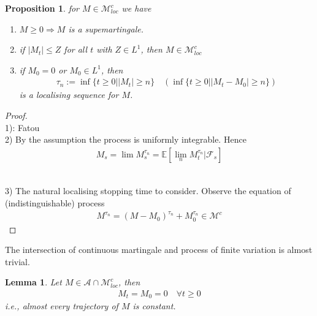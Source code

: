 \documentclass[a4paper,11pt]{book}
\newtheorem{lemma}[theorem]{Lemma}
\newtheorem{proposition}[theorem]{Proposition}
\theoremstyle{definition}
\theoremstyle{remark}
\begin{document}
\begin{proposition}
	for $M \in \mathcal{M}_{loc}^c$ we have
	\begin{enumerate}
		\item $M \ge 0 \Rightarrow M$ is a supemartingale. 
		\item if $|M_t| \le Z$ for all $t$ with $Z \in L^1$, then $M \in \mathcal{M}_{loc}^c$
		\item if $M_0 = 0$ or $M_0 \in L^1$, then 
		\begin{align*}
			\tau_n:= \inf \{ t \ge 0 | |M_t| \ge n \} 
			\quad (\inf \{ t \ge 0 | |M_t - M_0| \ge n\} )
		\end{align*}
		is a localising sequence for $M$. 
	\end{enumerate}
\end{proposition}
\begin{proof}
	\quad\\
	1): Fatou\\
	2) By the assumption the process is uniformly integrable. Hence
	\begin{align*}
		M_s = \lim M_s^{\tau_n} = \mathbb{E}[\lim_n M_t^{\tau_n} | \mathcal{F}_s]
	\end{align*}
	
	
	\quad\\
	3) The natural localising stopping time to consider. Observe the equation of (indistinguishable) process
	\begin{align*}
		M^{\tau_n} = (M - M_0)^{\tau_n} + M_0^{\tau_n} \in \mathcal{M}^c
	\end{align*}
\end{proof}

The intersection of continuous martingale and process of finite variation is almost trivial. 


\begin{lemma}
	Let $M \in \mathcal{A} \cap \mathcal{M}_{loc}^c$, then 
	\begin{align*}
		M_t = M_0 = 0 \quad \forall t \ge 0
	\end{align*}
	i.e., almost every trajectory of $M$ is constant. 
\end{lemma}
\end{document}
